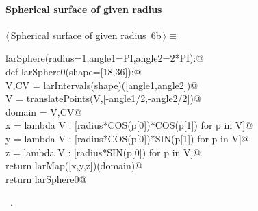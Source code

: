 \documentclass[11pt,oneside]{article}	%
\begin{document}
\paragraph{Spherical surface of given radius}
\begin{flushleft} \small \label{scrap10}
\protect{}$\langle\,$Spherical surface of given radius\nobreak\ {\footnotesize 6b}$\,\rangle\equiv$
\vspace{-1ex}
\begin{list}{}{} \item
\mbox{}\verb@def larSphere(radius=1,angle1=PI,angle2=2*PI):@\\
\mbox{}\verb@   def larSphere0(shape=[18,36]):@\\
\mbox{}\verb@      V,CV = larIntervals(shape)([angle1,angle2])@\\
\mbox{}\verb@      V = translatePoints(V,[-angle1/2,-angle2/2])@\\
\mbox{}\verb@      domain = V,CV@\\
\mbox{}\verb@      x = lambda V : [radius*COS(p[0])*COS(p[1]) for p in V]@\\
\mbox{}\verb@      y = lambda V : [radius*COS(p[0])*SIN(p[1]) for p in V]@\\
\mbox{}\verb@      z = lambda V : [radius*SIN(p[0]) for p in V]@\\
\mbox{}\verb@      return larMap([x,y,z])(domain)@\\
\mbox{}\verb@   return larSphere0@\\
\mbox{}\verb@@{\NWsep}
\end{list}
\vspace{-1ex}
\footnotesize\addtolength{\baselineskip}{-1ex}
\begin{list}{}{\setlength{\itemsep}{-\parsep}\setlength{\itemindent}{-\leftmargin}}
\item \NWtxtMacroRefIn\ .
\end{list}
\end{flushleft}
\end{document}
